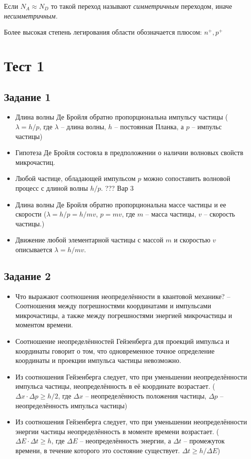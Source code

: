 \documentclass[../main.tex]{subfiles}
\begin{document}
 Если $N_A \approx N_D$ то такой переход называют \textit{симметричным} переходом, иначе \textit{несимметричным.} 

Более высокая степень легирования области обозначается плюсом: $n^{+}, p^{+}$


\section{Тест 1}

\subsection{Задание 1}
\begin{itemize}
    \item Длина волны Де Бройля обратно пропорциональна импульсу частицы ($\lambda = h/p$, где $\lambda$ -- длина волны, $h$ -- постоянная Планка, а $p$ -- импульс частицы)
    \item Гипотеза Де Бройля состояла в предположении о наличии волновых свойств микрочастиц.
    \item Любой частице, обладающей импульсом $p$ можно сопоставить волновой процесс с длиной волны $h/p$. ??? Вар 3
    \item Длина волны Де Бройля обратно пропорциональна массе частицы и ее скорости ($\lambda = h/p = h/mv$, $p = mv$, где $m$ -- масса частицы, $v$ -- скорость частицы.)
    \item Движение любой элементарной частицы с массой $m$ и скоростью $v$ описывается $\lambda = h/mv$.
\end{itemize}

\subsection{Задание 2}
\begin{itemize}
    \item Что выражают соотношения неопределённости в квантовой механике? -- Соотношения между погрешностями координатами и импульсами микрочастицы, а также между погрешностями энергией микрочастицы и моментом времени.
    \item Соотношение неопределённостей Гейзенберга для проекций импульса и координаты говорит о том, что одновременное точное определение координаты и проекции импульса частицы невозможно.
    \item Из соотношения Гейзенберга следует, что при уменьшении неопределённости импульса частицы, неопределённость в её координате возрастает. ($\Delta x \cdot \Delta p \ge h/2$, где $\Delta x$ -- неопределённость положения частицы, $\Delta p$ -- неопределённость импульса частицы)
    \item Из соотношения Гейзенберга следует, что при уменьшении неопределённости энергии частицы неопределённость в моменте времени возрастает. ($\Delta E \cdot \Delta t \ge h$, где $\Delta E$ -- неопределённость энергии, а $\Delta t$ -- промежуток времени, в течение которого это состояние существует. $\Delta t \ge h/\Delta E$)
\end{itemize}
\end{document}
